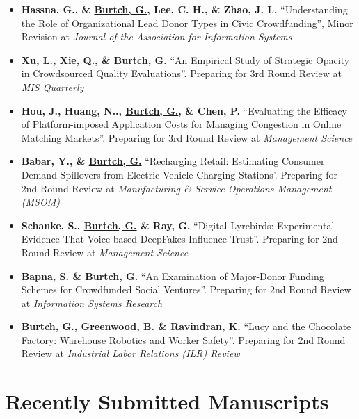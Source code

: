 \documentclass[10.5pt,letterpaper,sans]{moderncv}        %
\begin{document}
\begin{itemize}[leftmargin=!,labelindent=5pt,itemindent=-15pt]

\item \textbf{Hassna, G., \& \underline{Burtch, G.}, Lee, C. H., \& Zhao, J. L.} ``Understanding the Role of Organizational Lead Donor Types in Civic Crowdfunding'', Minor Revision at \textit{Journal of the Association for Information Systems}

\item \textbf{Xu, L., Xie, Q., \& \underline{Burtch, G.}} ``An Empirical Study of Strategic Opacity in Crowdsourced Quality Evaluations''. Preparing for 3rd Round Review at \textit{MIS Quarterly}

\item \textbf{Hou, J., Huang, N.., \underline{Burtch, G.}, \& Chen, P.} ``Evaluating the Efficacy of Platform-imposed Application Costs for Managing Congestion in Online Matching Markets''. Preparing for 3rd Round Review at \textit{Management Science} 

\item \textbf{Babar, Y., \& \underline{Burtch, G.}} ``Recharging Retail: Estimating Consumer Demand Spillovers from Electric Vehicle Charging Stations'. Preparing for 2nd Round Review at \textit{Manufacturing \& Service Operations Management (MSOM)} 

\item \textbf{Schanke, S.,  \underline{Burtch, G.} \& Ray, G.} ``Digital Lyrebirds: Experimental Evidence That Voice-based DeepFakes Influence Trust''. Preparing for 2nd Round Review at \textit{Management Science} 

\item \textbf{Bapna, S. \& \underline{Burtch, G.}} ``An Examination of Major-Donor Funding Schemes for Crowdfunded Social Ventures''. Preparing for 2nd Round Review at \textit{Information Systems Research}

\item \textbf{\underline{Burtch, G.}, Greenwood, B. \& Ravindran, K.} ``Lucy and the Chocolate Factory: Warehouse Robotics and Worker Safety''. Preparing for 2nd Round Review at \textit{Industrial Labor Relations (ILR) Review} 

\end{itemize}

\section{Recently Submitted Manuscripts}
\end{document}
